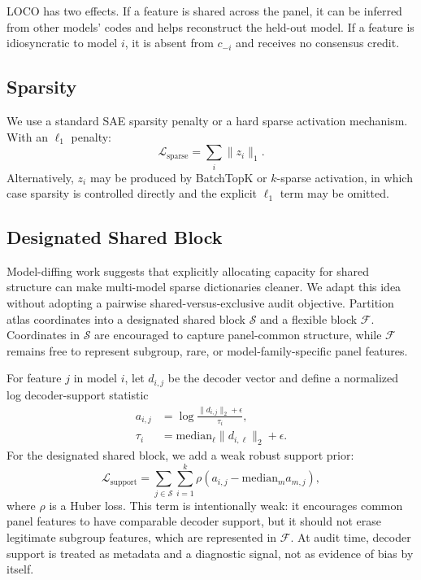 \documentclass[11pt]{article}
\newcommand{\shared}{\mathcal{S}}
\newcommand{\flex}{\mathcal{F}}
\begin{document}
LOCO has two effects. If a feature is shared across the panel, it can be inferred from other models' codes and helps reconstruct the held-out model. If a feature is idiosyncratic to model $i$, it is absent from $c_{-i}$ and receives no consensus credit.

\subsection{Sparsity}

We use a standard SAE sparsity penalty or a hard sparse activation mechanism. With an $\ell_1$ penalty:
\begin{equation}
    \mathcal{L}_{\mathrm{sparse}} = \sum_i \|z_i\|_1.
\end{equation}
Alternatively, $z_i$ may be produced by BatchTopK or $k$-sparse activation, in which case sparsity is controlled directly and the explicit $\ell_1$ term may be omitted.

\subsection{Designated Shared Block}

Model-diffing work suggests that explicitly allocating capacity for shared structure can make multi-model sparse dictionaries cleaner. We adapt this idea without adopting a pairwise shared-versus-exclusive audit objective. Partition atlas coordinates into a designated shared block $\shared$ and a flexible block $\flex$. Coordinates in $\shared$ are encouraged to capture panel-common structure, while $\flex$ remains free to represent subgroup, rare, or model-family-specific panel features.

For feature $j$ in model $i$, let $d_{i,j}$ be the decoder vector and define a normalized log decoder-support statistic
\begin{equation}
    \begin{aligned}
    a_{i,j} &=
    \log\frac{\|d_{i,j}\|_2+\epsilon}{\tau_i},\\
    \tau_i &= \mathrm{median}_{\ell}\|d_{i,\ell}\|_2+\epsilon.
    \end{aligned}
\end{equation}
For the designated shared block, we add a weak robust support prior:
\begin{equation}
    \mathcal{L}_{\mathrm{support}}
    =
    \sum_{j\in\shared}\sum_{i=1}^{k}
    \rho\left(a_{i,j}-\mathrm{median}_{m}a_{m,j}\right),
\end{equation}
where $\rho$ is a Huber loss. This term is intentionally weak: it encourages common panel features to have comparable decoder support, but it should not erase legitimate subgroup features, which are represented in $\flex$. At audit time, decoder support is treated as metadata and a diagnostic signal, not as evidence of bias by itself.
\end{document}
